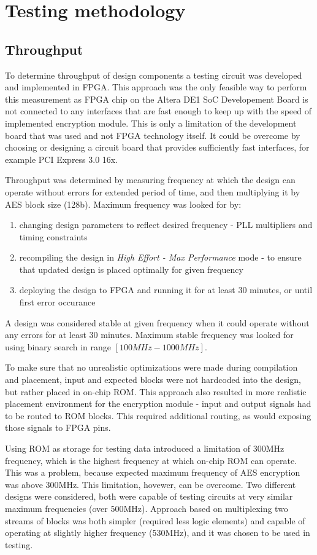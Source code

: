 \section{Testing methodology}
\label{sec:testing-methodology}

\subsection{Throughput}
To determine throughput of design components a testing circuit was developed and implemented in FPGA. This approach was the only feasible way to perform this measurement as FPGA chip on the Altera DE1 SoC Developement Board is not connected to any interfaces that are fast enough to keep up with the speed of implemented encryption module. This is only a limitation of the development board that was used and not FPGA technology itself. It could be overcome by choosing or designing a circuit board that provides sufficiently fast interfaces, for example PCI Express 3.0 16x.

Throughput was determined by measuring frequency at which the design can operate without errors for extended period of time, and then multiplying it by AES block size (128b). Maximum frequency was looked for by:
\begin{enumerate}[nolistsep]
\item changing design parameters to reflect desired frequency - PLL multipliers and timing constraints
\item recompiling the design in \textit{High Effort - Max Performance} mode - to ensure that updated design is placed optimally for given frequency
\item deploying the design to FPGA and running it for at least 30 minutes, or until first error occurance
\end{enumerate}
A design was considered stable at given frequency when it could operate without any errors for at least 30 minutes. Maximum stable frequency was looked for using binary search in range $[100MHz - 1000MHz]$. 

To make sure that no unrealistic optimizations were made during compilation and placement, input and expected blocks were not hardcoded into the design, but rather placed in on-chip ROM. This approach also resulted in more realistic placement environment for the encryption module - input and output signals had to be routed to ROM blocks. This required additional routing, as would exposing those signals to FPGA pins. 

Using ROM as storage for testing data introduced a limitation of 300MHz frequency, which is the highest frequency at which on-chip ROM can operate. This was a problem, because expected maximum frequency of AES encryption was above 300MHz. This limitation, hovewer, can be overcome. Two different designs were considered, both were capable of testing circuits at very similar maximum frequencies (over 500MHz). Approach based on multiplexing two streams of blocks was both simpler (required less logic elements) and capable of operating at slightly higher frequency (530MHz), and it was chosen to be used in testing.


